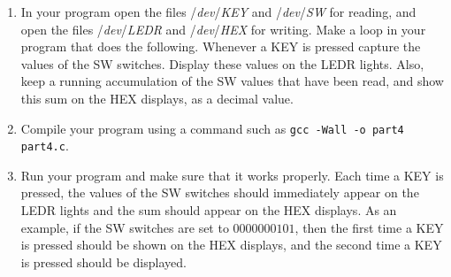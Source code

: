 \documentclass[epsfig,10pt,fullpage]{article}
\newcommand{\CommonDocsPath}{../../common/docs}
\begin{document}
\begin{enumerate}
\item In your program open the files /{\it dev}/{\it KEY} and /{\it dev}/{\it SW} for reading, 
and open the files /{\it dev}/{\it LEDR} and /{\it dev}/{\it HEX} for writing. Make a loop
in your program that does the following. Whenever a KEY is pressed capture the values of
the SW switches. Display these values on the LEDR lights. Also, keep a running
accumulation of the SW values that have been read, and show this sum on the HEX displays,
as a decimal value. 
\item Compile your program using a command such as \texttt{gcc -Wall -o part4 part4.c}.
\item Run your program and make sure that it works properly. Each time a KEY is
pressed, the values of the SW switches should immediately appear on the LEDR lights and the
sum should appear on the HEX displays. As an example, if the SW switches are set to 
$0000000101$, then the first time a KEY is pressed  should be shown on the HEX 
displays, and the second time a KEY is pressed  should be displayed.
\end{enumerate}
\vskip 0.8in
\newpage

\end{document}
